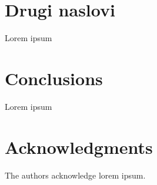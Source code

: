 \documentclass{acm_proc_article-sp}
\begin{document}
%
%

\section{Drugi naslovi}

Lorem ipsum

\section{Conclusions}

Lorem ipsum

\section{Acknowledgments}

The authors acknowledge lorem ipsum.





\balancecolumns
\end{document}
